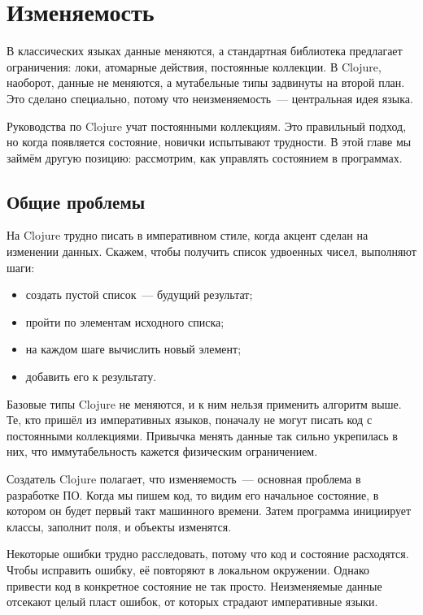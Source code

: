 
\chapter{Изменяемость}


\begin{teaser}
В классических языках данные меняются, а стандартная библиотека предлагает
ограничения: локи, атомарные действия, постоянные коллекции. В Clojure,
наоборот, данные не меняются, а мутабельные типы задвинуты на второй план. Это
сделано специально, потому что неизменяемость~--- центральная идея языка.
\end{teaser}

Руководства по Clojure учат постоянными коллекциям. Это правильный подход, но
когда появляется состояние, новички испытывают трудности. В этой главе мы займём
другую позицию: рассмотрим, как управлять состоянием в программах.

\section{Общие проблемы}

На Clojure трудно писать в императивном стиле, когда акцент сделан на изменении
данных. Скажем, чтобы получить список удвоенных чисел, выполняют шаги:


\begin{itemize}
\item
  создать пустой список~--- будущий результат;
\item
  пройти по элементам исходного списка;
\item
  на каждом шаге вычислить новый элемент;
\item
  добавить его к результату.
\end{itemize}

Базовые типы Clojure не меняются, и к ним нельзя применить алгоритм выше. Те,
кто пришёл из императивных языков, поначалу не могут писать код с
постоянными коллекциями. Привычка менять данные так сильно укрепилась в них, что
иммутабельность кажется физическим ограничением.

Создатель Clojure полагает, что изменяемость~--- основная проблема в разработке
ПО. Когда мы пишем код, то видим его начальное состояние, в котором он будет
первый такт машинного времени. Затем программа инициирует классы, заполнит поля,
и объекты изменятся.

Некоторые ошибки трудно расследовать, потому что код и состояние
расходятся. Чтобы исправить ошибку, её повторяют в локальном окружении. Однако
привести код в конкретное состояние не так просто. Неизменяемые данные отсекают
целый пласт ошибок, от которых страдают императивные языки.

